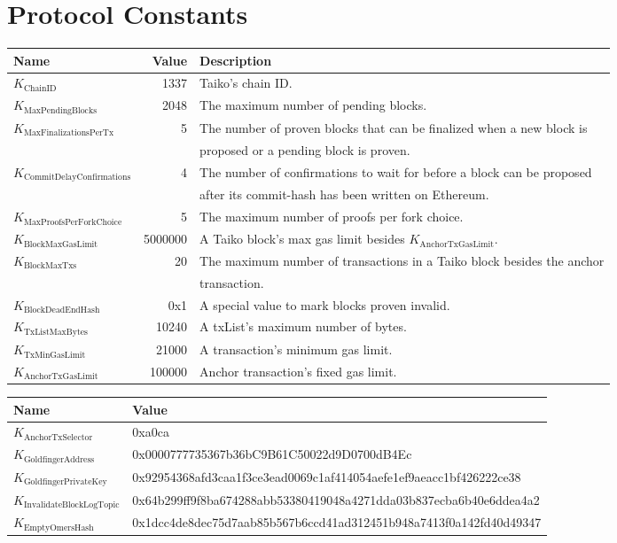 \documentclass[9pt,oneside]{amsart}
\begin{document}
\section{Protocol Constants}\label{sec:constants1}

\begin{tabu}{l r l}
\toprule
Name & Value & Description \\
\midrule
$K_{\mathrm{ChainID}}$ & 1337 & Taiko's chain ID. \\
$K_{\mathrm{MaxPendingBlocks}}$ & 2048 & The maximum number of pending blocks. \\
$K_{\mathrm{MaxFinalizationsPerTx}}$ & 5 & The number of proven blocks that can be finalized when a new block is\\
& & proposed or a pending block is proven. \\
$K_{\mathrm{CommitDelayConfirmations}}$ & 4 & The number of confirmations to wait for before a block can be proposed\\
& &  after its commit-hash has been written on Ethereum.\\
$K_{\mathrm{MaxProofsPerForkChoice}}$ & 5 & The maximum number of proofs per fork choice. \\
$K_{\mathrm{BlockMaxGasLimit}}$ & 5000000 & A Taiko block's max gas limit besides $K_{\mathrm{AnchorTxGasLimit}}$.  \\
$K_{\mathrm{BlockMaxTxs}}$ & 20 & The maximum number of transactions in a Taiko block besides the anchor\\
& & transaction. \\
$K_{\mathrm{BlockDeadEndHash}}$ & 0x1 & A special value to mark blocks proven invalid. \\
$K_{\mathrm{TxListMaxBytes}}$ & 10240 & A txList's maximum number of bytes. \\
$K_{\mathrm{TxMinGasLimit}}$ & 21000 & A transaction's minimum gas limit. \\
$K_{\mathrm{AnchorTxGasLimit}}$ & 100000 & Anchor transaction's fixed gas limit. \\
\bottomrule
\end{tabu}

\begin{tabu}{l l}
\toprule
Name &  \quad \quad Value \\
\midrule
$K_{\mathrm{AnchorTxSelector}}$ &  \quad \quad 0xa0ca \\
$K_{\mathrm{GoldfingerAddress}}$ &  \quad \quad 0x0000777735367b36bC9B61C50022d9D0700dB4Ec  \\
$K_{\mathrm{GoldfingerPrivateKey}}$ & \quad \quad 0x92954368afd3caa1f3ce3ead0069c1af414054aefe1ef9aeacc1bf426222ce38 \\
$K_{\mathrm{InvalidateBlockLogTopic}}$ & \quad \quad 0x64b299ff9f8ba674288abb53380419048a4271dda03b837ecba6b40e6ddea4a2 \\
$K_{\mathrm{EmptyOmersHash}}$ & \quad \quad 0x1dcc4de8dec75d7aab85b567b6ccd41ad312451b948a7413f0a142fd40d49347   \quad \quad \quad \quad \\
\bottomrule
\end{tabu}
\end{document}
